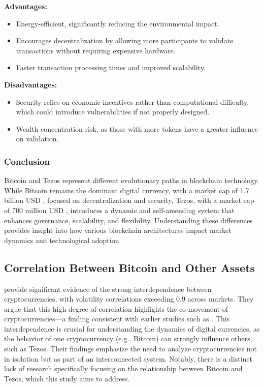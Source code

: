 \textbf{Advantages:}
\begin{itemize}
    \item Energy-efficient, significantly reducing the environmental impact.
    \item Encourages decentralization by allowing more participants to validate transactions without requiring expensive hardware.
    \item Faster transaction processing times and improved scalability.
\end{itemize}

\textbf{Disadvantages:}
\begin{itemize}
    \item Security relies on economic incentives rather than computational difficulty, which could introduce vulnerabilities if not properly designed.
    \item Wealth concentration risk, as those with more tokens have a greater influence on validation.
\end{itemize}


\subsubsection{Conclusion}

Bitcoin and Tezos represent different evolutionary paths in blockchain technology. While Bitcoin remains the dominant digital currency, with a market cap of 1.7 billion USD \textcite{coinmarketcap}, focused on decentralization and security, Tezos, with a market cap of 700 million USD \textcite{coinmarketcap}, introduces a dynamic and self-amending system that enhances governance, scalability, and flexibility. Understanding these differences provides insight into how various blockchain architectures impact market dynamics and technological adoption.

\subsection{Correlation Between Bitcoin and Other Assets}
\textcite{hossain2021there} provide significant evidence of the strong interdependence between cryptocurrencies, with volatility correlations exceeding 0.9 across markets. They argue that this high degree of correlation highlights the co-movement of cryptocurrencies—a finding consistent with earlier studies such as \autocite{guesmi2019portfolio}. This interdependence is crucial for understanding the dynamics of digital currencies, as the behavior of one cryptocurrency (e.g., Bitcoin) can strongly influence others, such as Tezos. Their findings emphasize the need to analyze cryptocurrencies not in isolation but as part of an interconnected system. Notably, there is a distinct lack of research specifically focusing on the relationship between Bitcoin and Tezos, which this study aims to address.

